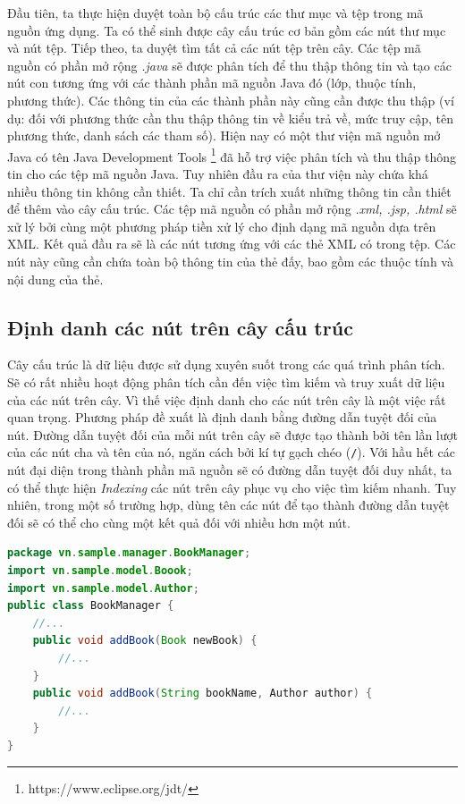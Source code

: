 \documentclass[12pt]{report}
\begin{document}
Đầu tiên, ta thực hiện duyệt toàn bộ cấu trúc các thư mục và tệp trong mã nguồn ứng dụng. Ta có thể sinh được cây cấu trúc cơ bản gồm các nút thư mục và nút tệp. Tiếp theo, ta duyệt tìm tất cả các nút tệp trên cây. Các tệp mã nguồn có phần mở rộng \textit{.java} sẽ được phân tích  để thu thập thông tin và tạo các nút con tương ứng với các thành phần mã nguồn Java đó (lớp, thuộc tính, phương thức). Các thông tin của các thành phần này cũng cần được thu thập (ví dụ: đối với phương thức cần thu thập thông tin về kiểu trả về, mức truy cập, tên phương thức, danh sách các tham số). Hiện nay có một thư viện mã nguồn mở Java có tên Java Development Tools \footnote{https://www.eclipse.org/jdt/} đã hỗ trợ việc phân tích và thu thập thông tin cho các tệp mã nguồn Java. Tuy nhiên đầu ra của thư viện này chứa khá nhiều thông tin không cần thiết. Ta chỉ cần trích xuất những thông tin cần thiết để thêm vào cây cấu trúc. Các tệp mã nguồn có phần mở rộng \textit{.xml, .jsp, .html} sẽ xử lý bởi cùng một phương pháp tiền xử lý cho định dạng mã nguồn dựa trên XML. Kết quả đầu ra sẽ là các nút tương ứng với các thẻ XML có trong tệp. Các nút này cũng cần chứa toàn bộ thông tin của thẻ đấy, bao gồm các thuộc tính và nội dung của thẻ.

\subsection{Định danh các nút trên cây cấu trúc}
Cây cấu trúc là dữ liệu được sử dụng xuyên suốt trong các quá trình phân tích. Sẽ có rất nhiều hoạt động phân tích cần đến việc tìm kiếm và truy xuất dữ liệu của các nút trên cây. Vì thế việc định danh cho các nút trên cây là một việc rất quan trọng. Phương pháp đề xuất là định danh bằng đường dẫn tuyệt đối của nút. Đường dẫn tuyệt đối của mỗi nút trên cây sẽ được tạo thành bởi tên lần lượt của các nút cha và tên của nó, ngăn cách bởi kí tự gạch chéo (\texttt{/}). Với hầu hết các nút đại diện trong thành phần mã nguồn sẽ có đường dẫn tuyệt đối duy nhất, ta có thể thực hiện \textit{Indexing} các nút trên cây phục vụ cho việc tìm kiếm nhanh. Tuy nhiên, trong một số trường hợp, dùng tên các nút để tạo thành đường dẫn tuyệt đối sẽ có thể cho cùng một kết quả đối với nhiều hơn một nút.

\begin{lstlisting}[language=Java,
caption={Ví dụ chồng hàm trong Java},label={code:java-overloading}]
package vn.sample.manager.BookManager;
import vn.sample.model.Boook;
import vn.sample.model.Author;
public class BookManager {
	//...	
	public void addBook(Book newBook) {
		//...
	}
	public void addBook(String bookName, Author author) {
		//...
	}
}
\end{lstlisting}
\end{document}
